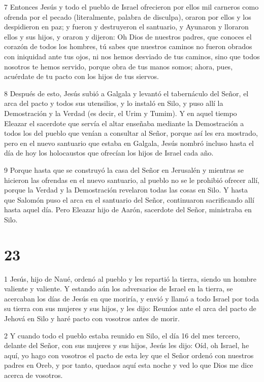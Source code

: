 \par 7 Entonces Jesús y todo el pueblo de Israel ofrecieron por ellos mil carneros como ofrenda por el pecado (literalmente, palabra de disculpa), oraron por ellos y los despidieron en paz; y fueron y destruyeron el santuario, y Ayunaron y lloraron ellos y sus hijos, y oraron y dijeron: Oh Dios de nuestros padres, que conoces el corazón de todos los hombres, tú sabes que nuestros caminos no fueron obrados con iniquidad ante tus ojos, ni nos hemos desviado de tus caminos, sino que todos nosotros te hemos servido, porque obra de tus manos somos; ahora, pues, acuérdate de tu pacto con los hijos de tus siervos.

\par 8 Después de esto, Jesús subió a Galgala y levantó el tabernáculo del Señor, el arca del pacto y todos sus utensilios, y lo instaló en Silo, y puso allí la Demostración y la Verdad (es decir, el Urim y Tumim). Y en aquel tiempo Eleazar el sacerdote que servía el altar enseñaba mediante la Demostración a todos los del pueblo que venían a consultar al Señor, porque así les era mostrado, pero en el nuevo santuario que estaba en Galgala, Jesús nombró incluso hasta el día de hoy los holocaustos que ofrecían los hijos de Israel cada año.

\par 9 Porque hasta que se construyó la casa del Señor en Jerusalén y mientras se hicieron las ofrendas en el nuevo santuario, al pueblo no se le prohibió ofrecer allí, porque la Verdad y la Demostración revelaron todas las cosas en Silo. Y hasta que Salomón puso el arca en el santuario del Señor, continuaron sacrificando allí hasta aquel día. Pero Eleazar hijo de Aarón, sacerdote del Señor, ministraba en Silo.



\chapter{23}

\par 1 Jesús, hijo de Naué, ordenó al pueblo y les repartió la tierra, siendo un hombre valiente y valiente. Y estando aún los adversarios de Israel en la tierra, se acercaban los días de Jesús en que moriría, y envió y llamó a todo Israel por toda su tierra con sus mujeres y sus hijos, y les dijo: Reuníos ante el arca del pacto de Jehová en Silo y haré pacto con vosotros antes de morir.

\par 2 Y cuando todo el pueblo estaba reunido en Silo, el día 16 del mes tercero, delante del Señor, con sus mujeres y sus hijos, Jesús les dijo: Oíd, oh Israel, he aquí, yo hago con vosotros el pacto de esta ley que el Señor ordenó con nuestros padres en Oreb, y por tanto, quedaos aquí esta noche y ved lo que Dios me dice acerca de vosotros.


